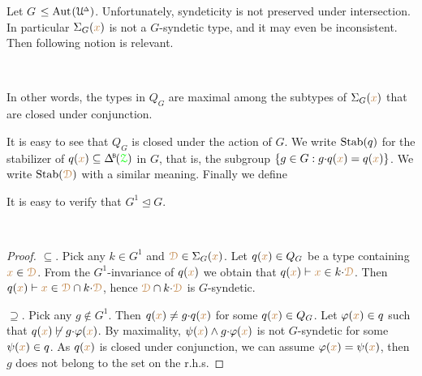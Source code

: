 Let \emph{$G$\/} $\le{\rm Aut\kern.15ex}(\EuScript U\kern-.2ex^{\scriptscriptstyle\Delta})$.
Unfortunately, syndeticity is not preserved under intersection.
In particular $\Sigma_G({\color{brown} x})$ is not a $G$-syndetic type, and it may even be inconsistent.
Then following notion is relevant.

\begin{definition}\label{def_Q}\ 

  \smallskip

  In other words, the types in $Q_G$ are maximal among the subtypes of $\Sigma_G({\color{brown} x})$ that are closed under conjunction.
\end{definition}

It is easy to see that $Q_G$ is closed under the action of $G$.
We write ${\rm Stab}(q)$ for the stabilizer of $q({\mr x})\subseteq\BDelta(\grZ)$ in $G$, that is, the subgroup $\{g\in G:g{\cdot}q({\color{brown} x})=q({\color{brown} x})\}$.
We write ${\rm Stab}({\color{brown}\EuScript D})$ with a similar meaning.
Finally we define


It is easy to verify that $G^1\trianglelefteq G$.

\begin{proposition}\label{prop_StabQ}\ \smallskip

  \smallskip
\end{proposition}

\begin{proof}
  $\subseteq$.
  Pick any $k\in G^1$ and ${\color{brown}\EuScript D}\in\Sigma_G({\color{brown} x})$.
  Let $q({\color{brown} x})\in Q_G$ be a type containing ${\color{brown} x}\in{\color{brown}\EuScript D}$.
  From the $G^1$-invariance of $q({\color{brown} x})$ we obtain that $q({\color{brown} x})\vdash {\color{brown}x}\in k{\cdot}{\color{brown}\EuScript D}$.
  Then $q({\color{brown} x})\vdash {\color{brown}x}\in {\color{brown}\EuScript D}\cap k{\cdot}{\color{brown}\EuScript D}$, hence ${\color{brown}\EuScript D}\cap k{\cdot}{\color{brown}\EuScript D}$ is $G$-syndetic.

  $\supseteq$.
  Pick any $g\notin G^1$.
  Then $q({\color{brown} x})\neq g{\cdot}q({\color{brown} x})$ for some $q({\color{brown} x})\in Q_G$.
  Let $\varphi({\color{brown} x})\in q$ such that $q({\color{brown} x})\not\vdash g{\cdot}\varphi({\color{brown} x})$.
  By maximality, $\psi({\color{brown} x})\wedge g{\cdot}\varphi({\color{brown} x})$ is not $G$-syndetic for some $\psi({\color{brown} x})\in q$.
  As $q({\color{brown} x})$ is closed under conjunction, we can assume $\varphi({\color{brown} x})=\psi({\color{brown} x})$, then $g$ does not belong to the set on the r.h.s.
\end{proof}

